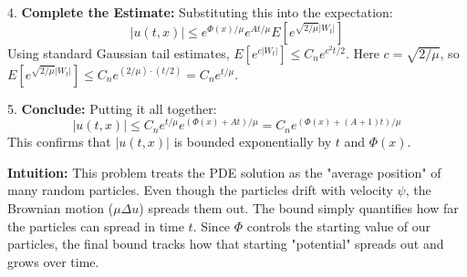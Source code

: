 \begin{solution}
4. \textbf{Complete the Estimate:}
Substituting this into the expectation:
\[ |u(t, x)| \leq e^{\Phi(x)/\mu} e^{At/\mu} E[e^{\sqrt{2/\mu}|W_t|}] \]
Using standard Gaussian tail estimates, $E[e^{c |W_t|}] \leq C_n e^{c^2 t / 2}$. Here $c = \sqrt{2/\mu}$, so $E[e^{\sqrt{2/\mu}|W_t|}] \leq C_n e^{(2/\mu) \cdot (t/2)} = C_n e^{t/\mu}$.

5. \textbf{Conclude:}
Putting it all together:
\[ |u(t, x)| \leq C_n e^{t/\mu} e^{(\Phi(x)+At)/\mu} = C_n e^{(\Phi(x) + (A+1)t)/\mu} \]
This confirms that $|u(t, x)|$ is bounded exponentially by $t$ and $\Phi(x)$.

\textbf{Intuition:}
This problem treats the PDE solution as the "average position" of many random particles. Even though the particles drift with velocity $\psi$, the Brownian motion ($\mu \Delta u$) spreads them out. The bound simply quantifies how far the particles can spread in time $t$. Since $\Phi$ controls the starting value of our particles, the final bound tracks how that starting "potential" spreads out and grows over time.
\end{solution}
